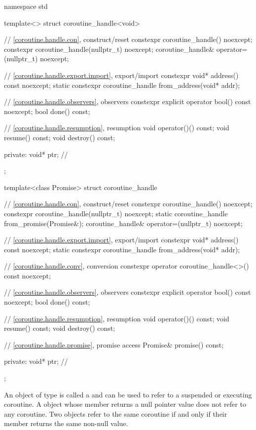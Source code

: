 %
\begin{codeblock}
namespace std {
  template<>
  struct coroutine_handle<void>
  {
    // \ref{coroutine.handle.con}, construct/reset
    constexpr coroutine_handle() noexcept;
    constexpr coroutine_handle(nullptr_t) noexcept;
    coroutine_handle& operator=(nullptr_t) noexcept;

    // \ref{coroutine.handle.export.import}, export/import
    constexpr void* address() const noexcept;
    static constexpr coroutine_handle from_address(void* addr);

    // \ref{coroutine.handle.observers}, observers
    constexpr explicit operator bool() const noexcept;
    bool done() const;

    // \ref{coroutine.handle.resumption}, resumption
    void operator()() const;
    void resume() const;
    void destroy() const;

  private:
    void* ptr;  // \expos
  };

  template<class Promise>
  struct coroutine_handle
  {
    // \ref{coroutine.handle.con}, construct/reset
    constexpr coroutine_handle() noexcept;
    constexpr coroutine_handle(nullptr_t) noexcept;
    static coroutine_handle from_promise(Promise&);
    coroutine_handle& operator=(nullptr_t) noexcept;

    // \ref{coroutine.handle.export.import}, export/import
    constexpr void* address() const noexcept;
    static constexpr coroutine_handle from_address(void* addr);

    // \ref{coroutine.handle.conv}, conversion
    constexpr operator coroutine_handle<>() const noexcept;

    // \ref{coroutine.handle.observers}, observers
    constexpr explicit operator bool() const noexcept;
    bool done() const;

    // \ref{coroutine.handle.resumption}, resumption
    void operator()() const;
    void resume() const;
    void destroy() const;

    // \ref{coroutine.handle.promise}, promise access
    Promise& promise() const;

  private:
    void* ptr;  // \expos
  };
}
\end{codeblock}

\pnum
An object of type
 is called a 
and can be used to refer to a suspended or executing coroutine.
A  object whose
member  returns a null pointer value
does not refer to any
coroutine.
Two  objects refer to the same coroutine
if and only if their member  returns the same non-null value.

